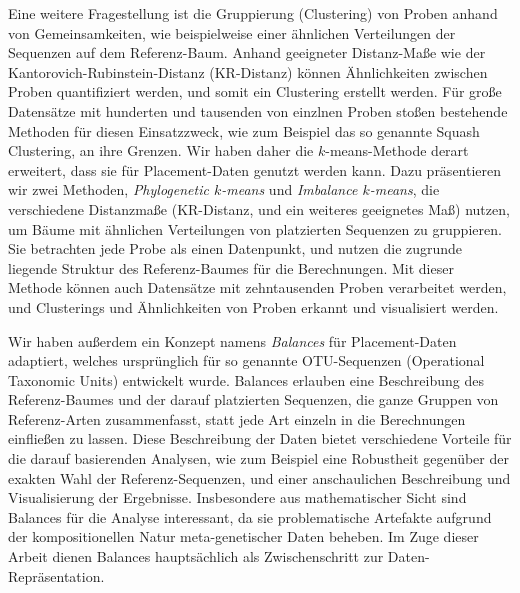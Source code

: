 Eine weitere Fragestellung ist die Gruppierung (Clustering) von Proben anhand von Gemeinsamkeiten,
wie beispielweise einer \"ahnlichen Verteilungen der Sequenzen auf dem Referenz-Baum.
Anhand geeigneter Distanz-Ma\ss{}e wie der Kantorovich-Rubinstein-Distanz (KR-Distanz)
k\"onnen \"Ahnlichkeiten zwischen Proben quantifiziert werden, und somit ein Clustering erstellt werden.
F\"ur gro\ss{}e Datens\"atze mit hunderten und tausenden von einzlnen Proben sto\ss{}en bestehende Methoden
f\"ur diesen Einsatzzweck, wie zum Beispiel das so genannte Squash Clustering, an ihre Grenzen.
Wir haben daher die $k$-means-Methode derart erweitert, dass sie f\"ur Placement-Daten genutzt werden kann.
Dazu pr\"asentieren wir zwei Methoden, \emph{Phylogenetic $k$-means} und \emph{Imbalance $k$-means},
die verschiedene Distanzma\ss{}e (KR-Distanz, und ein weiteres geeignetes Ma\ss{}) nutzen,
um B\"aume mit \"ahnlichen Verteilungen von platzierten Sequenzen zu gruppieren.
Sie betrachten jede Probe als einen Datenpunkt,
und nutzen die zugrunde liegende Struktur des Referenz-Baumes f\"ur die Berechnungen.
Mit dieser Methode k\"onnen auch Datens\"atze mit zehntausenden Proben verarbeitet werden,
und Clusterings und \"Ahnlichkeiten von Proben erkannt und visualisiert werden.

Wir haben au\ss{}erdem ein Konzept namens \emph{Balances} f\"ur Placement-Daten adaptiert,
welches urspr\"unglich f\"ur so genannte OTU-Sequenzen (Operational Taxonomic Units) entwickelt wurde.
Balances erlauben eine Beschreibung des Referenz-Baumes und der darauf platzierten Sequenzen,
die ganze Gruppen von Referenz-Arten zusammenfasst,
statt jede Art einzeln in die Berechnungen einflie\ss{}en zu lassen.
Diese Beschreibung der Daten bietet verschiedene Vorteile f\"ur die darauf basierenden Analysen,
wie zum Beispiel eine Robustheit gegen\"uber der exakten Wahl der Referenz-Sequenzen,
und einer anschaulichen Beschreibung und Visualisierung der Ergebnisse.
Insbesondere aus mathematischer Sicht sind Balances f\"ur die Analyse interessant,
da sie problematische Artefakte aufgrund der kompositionellen Natur meta-genetischer Daten beheben.
Im Zuge dieser Arbeit dienen Balances haupts\"achlich als Zwischenschritt zur Daten-Repr\"asentation.

